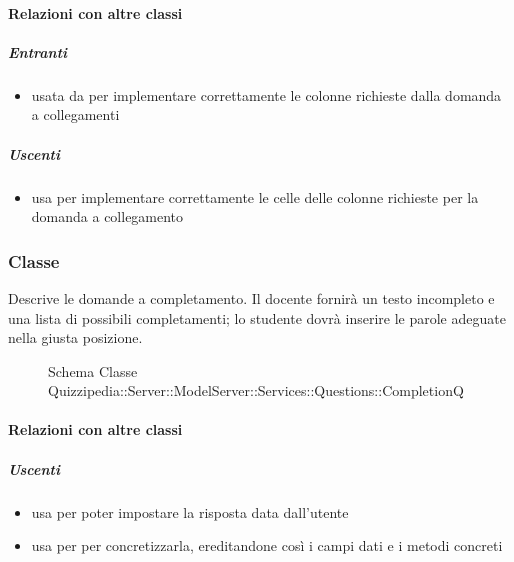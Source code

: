 \paragraph{Relazioni con altre classi}
\subparagraph{Entranti}
\begin{itemize}
\item usata da  per implementare correttamente le colonne richieste dalla domanda a collegamenti
\end{itemize}
\subparagraph{Uscenti}
\begin{itemize}
\item usa  per implementare correttamente le celle delle colonne richieste per la domanda a collegamento
\end{itemize}
\subsubsection{Classe }
Descrive le domande a completamento. Il docente fornirà un testo incompleto e una lista di possibili completamenti; lo studente dovrà inserire le parole adeguate nella giusta posizione.
\begin{figure}[H]
\centering
\noindent{}
\caption[Schema Classe CompletionQ]{Schema Classe Quizzipedia::Server::ModelServer::Services::Questions::CompletionQ}
\end{figure}
\paragraph{Relazioni con altre classi}
\subparagraph{Uscenti}
\begin{itemize}
\item usa  per poter impostare la risposta data dall'utente
\item usa  per per concretizzarla, ereditandone così i campi dati e i metodi concreti
\end{itemize}

